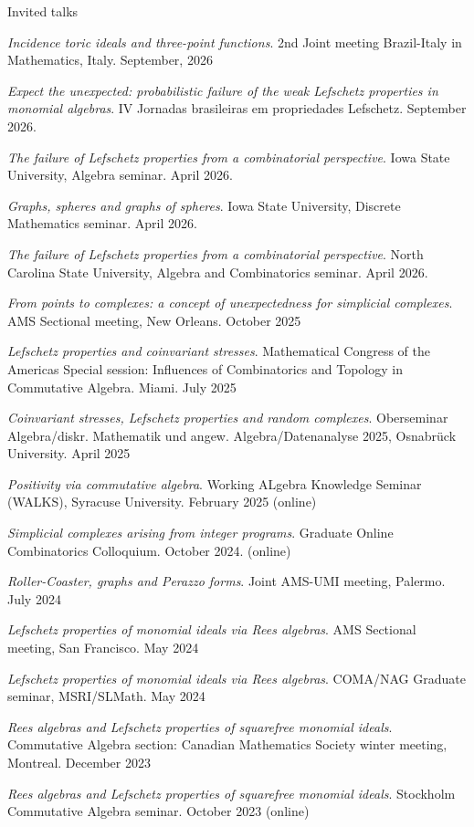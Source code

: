 \documentclass[12pt]{resume} %
\begin{document}
\begin{rSection}{Invited talks}
    \item \textit{Incidence toric ideals and three-point functions}. 2nd Joint meeting Brazil-Italy in Mathematics, Italy. September, 2026 
    \item \textit{Expect the unexpected: probabilistic failure of the weak Lefschetz properties in monomial algebras}. IV Jornadas brasileiras em propriedades Lefschetz. September 2026.
    \item \textit{The failure of Lefschetz properties from a combinatorial perspective}. Iowa State University, Algebra seminar. April 2026.
    \item \textit{Graphs, spheres and graphs of spheres}. Iowa State University, Discrete Mathematics seminar. April 2026.
    \item \textit{The failure of Lefschetz properties from a combinatorial perspective}. North Carolina State University, Algebra and Combinatorics seminar. April 2026.
    \item \textit{From points to complexes: a concept of unexpectedness for simplicial complexes}. AMS Sectional meeting, New Orleans. October 2025 
    \item \textit{Lefschetz properties and coinvariant stresses}. Mathematical Congress of the Americas Special session: Influences of Combinatorics and Topology in Commutative Algebra. Miami. July 2025 
    \item \textit{Coinvariant stresses, Lefschetz properties and random complexes}. Oberseminar Algebra/diskr. Mathematik und angew. Algebra/Datenanalyse 2025, Osnabrück University. April 2025 
    \item \textit{Positivity via commutative algebra}. Working ALgebra Knowledge Seminar (WALKS), Syracuse University. February 2025 (online)
    \item \textit{Simplicial complexes arising from integer programs}. Graduate Online Combinatorics Colloquium. October 2024. (online)
    \item \textit{Roller-Coaster, graphs and Perazzo forms}. Joint AMS-UMI meeting, Palermo. July 2024
    \item \textit{Lefschetz properties of monomial ideals via Rees algebras}. AMS Sectional meeting, San Francisco. May 2024  
    \item \textit{Lefschetz properties of monomial ideals via Rees algebras}. COMA/NAG Graduate seminar, \newline MSRI/SLMath. May 2024  
    \item \textit{Rees algebras and Lefschetz properties of squarefree monomial ideals}. Commutative Algebra section: Canadian Mathematics Society winter meeting, Montreal. December 2023 
    \item \textit{Rees algebras and Lefschetz properties of squarefree monomial ideals}. Stockholm Commutative Algebra seminar. October 2023 (online)
\end{rSection}
\end{document}
